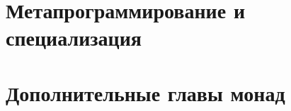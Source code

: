 \documentclass[12pt]{article}
\begin{document}



    \section{Метапрограммирование и специализация}









%
%
%
%
%
%
%
%
%
%


    \section{Дополнительные главы монад}
\end{document}

